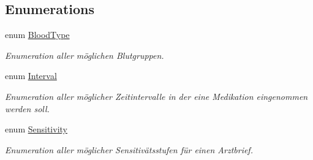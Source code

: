 \subsection*{Enumerations}
\begin{CompactItemize}
\item 
enum \hyperlink{namespacemy_m_d_1_1_model_interface_1_1_data_model_interface_ae7d78aea8d446d685c618fcde65e1a9}{Blood\-Type} 
\begin{CompactList}\small\item\em Enumeration aller m\"{o}glichen Blutgruppen. \item\end{CompactList}\item 
enum \hyperlink{namespacemy_m_d_1_1_model_interface_1_1_data_model_interface_d16dd01adf735ed9b87eebff5fc39ce5}{Interval} 
\begin{CompactList}\small\item\em Enumeration aller m\"{o}glicher Zeitintervalle in der eine Medikation eingenommen werden soll. \item\end{CompactList}\item 
enum \hyperlink{namespacemy_m_d_1_1_model_interface_1_1_data_model_interface_456ce8fc5315d26a3f7145a5228d8fd3}{Sensitivity} 
\begin{CompactList}\small\item\em Enumeration aller m\"{o}glicher Sensitiv\"{a}tsstufen f\"{u}r einen Arztbrief. \item\end{CompactList}\end{CompactItemize}
